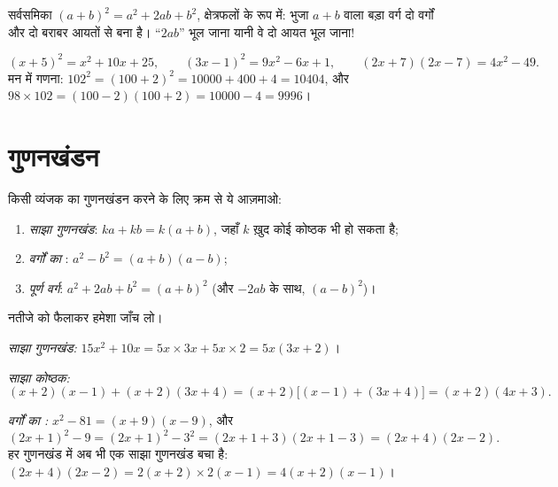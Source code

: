 \begin{omfigure}

{\small सर्वसमिका $(a+b)^2 = a^2 + 2ab + b^2$, क्षेत्रफलों के रूप
में: भुजा $a+b$ वाला बड़ा वर्ग दो वर्गों और दो बराबर आयतों से बना है।
``$2ab$'' भूल जाना यानी वे दो आयत भूल जाना!}
\end{omfigure}

\begin{example}\label{ex:g9:algebra:identities}
\[
(x + 5)^2 = x^2 + 10x + 25, \qquad
(3x - 1)^2 = 9x^2 - 6x + 1, \qquad
(2x + 7)(2x - 7) = 4x^2 - 49 .
\]
मन में गणना: $102^2 = (100 + 2)^2 = 10000 + 400 + 4 = 10404$, और
$98 \times 102 = (100-2)(100+2) = 10000 - 4 = 9996$।
\end{example}

\section{गुणनखंडन}

\begin{method}[गुणनखंडन]\label{met:g9:algebra:factor}
किसी व्यंजक का गुणनखंडन करने के लिए क्रम से ये आज़माओ:
\begin{enumerate}
  \item \emph{साझा गुणनखंड}: $ka + kb = k(a + b)$, जहाँ $k$ ख़ुद कोई
        कोष्ठक भी हो सकता है;
  \item \emph{वर्गों का }: $a^2 - b^2 = (a+b)(a-b)$;
  \item \emph{पूर्ण वर्ग}: $a^2 + 2ab + b^2 = (a+b)^2$ (और $-2ab$ के
        साथ, $(a-b)^2$)।
\end{enumerate}
नतीजे को फैलाकर हमेशा जाँच लो।
\end{method}

\begin{example}\label{ex:g9:algebra:factor}
\emph{साझा गुणनखंड:}
$15x^2 + 10x = 5x \times 3x + 5x \times 2 = 5x(3x + 2)$।

\emph{साझा कोष्ठक:}
\[
(x+2)(x-1) + (x+2)(3x+4) = (x+2)\bigl[(x-1) + (3x+4)\bigr]
= (x+2)(4x+3).
\]

\emph{वर्गों का :}
$x^2 - 81 = (x+9)(x-9)$, और
\[
(2x+1)^2 - 9 = (2x+1)^2 - 3^2 = (2x+1+3)(2x+1-3) = (2x+4)(2x-2).
\]
हर गुणनखंड में अब भी एक साझा गुणनखंड बचा है: $(2x+4)(2x-2) = 2(x+2)
\times 2(x-1) = 4(x+2)(x-1)$।
\end{example}

